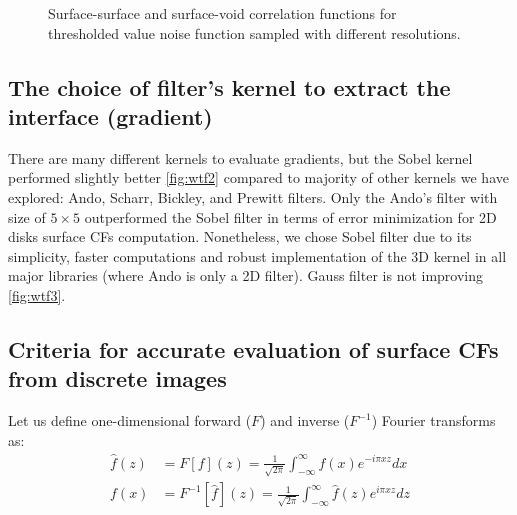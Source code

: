 \documentclass[reprint,amsmath,amssymb,aps,pre]{revtex4-1}
\begin{document}
\begin{figure}[ht]
  \centering
  \hfill
    \caption[]{Surface-surface and surface-void correlation functions for
      thresholded value noise function sampled with different resolutions.}
    \label{fig:scaling-noise}
\end{figure}

\subsection{The choice of filter’s kernel to extract the interface (gradient)}
There are many different kernels to evaluate gradients, but the Sobel kernel
performed slightly better \cref{fig:wtf2} compared to majority of other kernels
we have explored: Ando, Scharr, Bickley, and Prewitt filters. Only the Ando’s
filter with size of $5 \times 5$ \cite{ando_2000} outperformed the Sobel filter
in terms of error minimization for 2D disks surface CFs
computation. Nonetheless, we chose Sobel filter due to its simplicity, faster
computations and robust implementation of the 3D kernel in all major libraries
(where Ando is only a 2D filter). Gauss filter is not improving \cref{fig:wtf3}.

\subsection{Criteria for accurate evaluation of surface CFs from discrete images}
\label{sec:crit}
Let us define one-dimensional forward ($F$) and inverse ($F^{-1}$) Fourier
transforms as:
\begin{align}
  \hat{f}(z) &= F[f](z) = \frac{1}{\sqrt{2\pi}}\int_{-\infty}^{\infty} f(x)
  e^{-i\pi xz} dx \label{eq:fourier-forward} \\
  f(x) &= F^{-1}[\hat{f}](z) = \frac{1}{\sqrt{2\pi}}\int_{-\infty}^{\infty} \hat{f}(z)
  e^{i\pi xz} dz \label{eq:fourier-backward}
\end{align}
\end{document}
